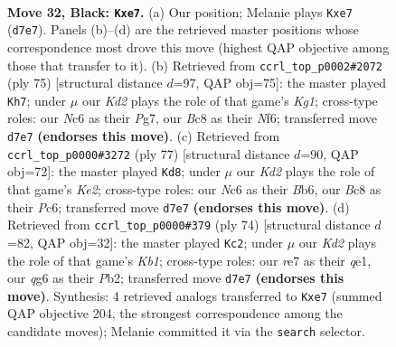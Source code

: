 \documentclass[11pt]{article}
\begin{document}
\clearpage

\begin{figure}[p]\centering
\begin{subfigure}{0.46\textwidth}\centering
\resizebox{\linewidth}{!}{%
\newchessgame
\chessboard[
  setfen={r1b5/1p1kR3/2n1p1Q1/pB2P3/P4P2/q7/4K3/6N1 b - - 0 32},
  showmover=false,
  pgfstyle=straightmove, color=movearrow, markmove={d7-e7}
]}
\caption{}
\end{subfigure}\hfill
\begin{subfigure}{0.46\textwidth}\centering
\resizebox{\linewidth}{!}{%
\newchessgame
\chessboard[
  setfen={5Rk1/5pp1/3Bpn1p/1r6/4b1P1/7P/1P3PBK/8 b - - 0 38},
  showmover=false,
  pgfstyle=straightmove, color=movearrow, markmove={g8-h7}
]}
\caption{}
\end{subfigure}
\\[4pt]
\begin{subfigure}{0.46\textwidth}\centering
\resizebox{\linewidth}{!}{%
\newchessgame
\chessboard[
  setfen={8/1p2kR1p/1bp1p3/p6B/2P3P1/1P6/P2r1nKB/8 b - - 14 39},
  showmover=false,
  pgfstyle=straightmove, color=movearrow, markmove={e7-d8}
]}
\caption{}
\end{subfigure}\hfill
\begin{subfigure}{0.46\textwidth}\centering
\resizebox{\linewidth}{!}{%
\newchessgame
\chessboard[
  setfen={3k4/8/p3bbQ1/1p6/3N2p1/P1PB4/1P5P/1K2q3 w - - 3 38},
  showmover=false,
  pgfstyle=straightmove, color=movearrow, markmove={b1-c2}
]}
\caption{}
\end{subfigure}
\caption{\textbf{Move 32, Black: \texttt{Kxe7}.} (a) Our position; Melanie plays \texttt{Kxe7} (\texttt{d7e7}). Panels (b)--(d) are the retrieved master positions whose correspondence most drove this move (highest QAP objective among those that transfer to it). (b) Retrieved from \texttt{ccrl\_top\_p0002\#2072} (ply 75) [structural distance $d$=97, QAP obj=75]: the master played \texttt{Kh7}; under $\mu$ our \emph{Kd2} plays the role of that game's \emph{Kg1}; cross-type roles: our \emph{N}c6 as their \emph{P}g7, our \emph{B}c8 as their \emph{N}f6; transferred move \texttt{d7e7} \textbf{(endorses this move)}. (c) Retrieved from \texttt{ccrl\_top\_p0000\#3272} (ply 77) [structural distance $d$=90, QAP obj=72]: the master played \texttt{Kd8}; under $\mu$ our \emph{Kd2} plays the role of that game's \emph{Ke2}; cross-type roles: our \emph{N}c6 as their \emph{B}b6, our \emph{B}c8 as their \emph{P}c6; transferred move \texttt{d7e7} \textbf{(endorses this move)}. (d) Retrieved from \texttt{ccrl\_top\_p0000\#379} (ply 74) [structural distance $d$=82, QAP obj=32]: the master played \texttt{Kc2}; under $\mu$ our \emph{Kd2} plays the role of that game's \emph{Kb1}; cross-type roles: our \emph{r}e7 as their \emph{q}e1, our \emph{q}g6 as their \emph{P}b2; transferred move \texttt{d7e7} \textbf{(endorses this move)}. Synthesis: 4 retrieved analogs transferred to \texttt{Kxe7} (summed QAP objective 204, the strongest correspondence among the candidate moves); Melanie committed it via the \texttt{search} selector.}
\label{fig:thought-m63}
\end{figure}
\end{document}
